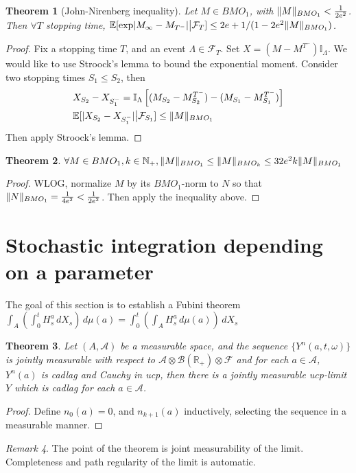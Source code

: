 \documentclass[openany,oneside]{book}
\newtheorem{thm}{Theorem}[section]
\theoremstyle{definition}
\theoremstyle{remark}
\newtheorem{rem}[thm]{Remark}
\newcommand{\E}{\mathbb{E}} %
\newcommand{\I}{\mathbb{I}} %
\DeclarePairedDelimiter{\abs}{\lvert}{\rvert} %
\DeclarePairedDelimiter{\norm}{\lVert}{\rVert} %
\begin{document}
\begin{thm}[John-Nirenberg inequality]
Let $M\in BMO_1$, with $\norm{M}_{BMO_1} < \frac{1}{2e^2}$. Then $\forall T$ stopping time, $\E[\exp\abs{M_\infty - M_{T^-}} \big\vert \mathcal{F}_T] \le 2e + 1/(1-2e^2 \norm{M}_{BMO_1})$.
\end{thm}
\begin{proof}
Fix a stopping time $T$, and an event $\Lambda \in \mathcal{F}_T$. Set $X=(M-M^{T^-})\I_\Lambda$. We would like to use Stroock's lemma to bound the exponential moment. Consider two stopping times $S_1 \le S_2$, then
\begin{align*}
& X_{S_2} - X_{S_1^-} = \I_\Lambda \left[(M_{S_2}-M^{T^-}_{S_2}) - (M_{S_1}-M^{T^-}_{S_1})\right] \\
& \E[\abs{X_{S_2} - X_{S_1^-}} \big\vert \mathcal{F}_{S_1}] \le \norm{M}_{BMO_1}
\end{align*}
Then apply Stroock's lemma.
\end{proof}

\begin{thm}
$\forall M \in BMO_1, k\in \mathbb{N}_+, \norm{M}_{BMO_1} \le \norm{M}_{BMO_k} \le 32 e^2 k \norm{M}_{BMO_1}$
\end{thm}
\begin{proof}
WLOG, normalize $M$ by its $BMO_1$-norm to $N$ so that $\norm{N}_{BMO_1} = \frac{1}{4e^2} < \frac{1}{2e^2}$. Then apply the inequality above.
\end{proof}

\section{Stochastic integration depending on a parameter}
The goal of this section is to establish a Fubini theorem $\int_A \left(\int_0^t H^a_s \,d X_s\right) \,d\mu(a) = \int_0^t \left(\int_A H^a_s \,d\mu(a)\right) \,d X_s$

\begin{thm}
Let $(A,\mathcal{A})$ be a measurable space, and the sequence $\{Y^n(a,t,\omega)\}$ is jointly measurable with respect to $\mathcal{A} \otimes \mathcal{B}(\mathbb{R}_+) \otimes \mathcal{F}$ and for each $a\in\mathcal{A}$, $Y^n(a)$ is cadlag and Cauchy in ucp, then there is a jointly measurable ucp-limit $Y$ which is cadlag for each $a\in \mathcal{A}$.
\end{thm}
\begin{proof}
Define $n_0(a)=0$, and $n_{k+1}(a)$ inductively, selecting the sequence in a measurable manner.
\end{proof}
\begin{rem}
The point of the theorem is joint measurability of the limit. Completeness and path regularity of the limit is automatic.
\end{rem}
\end{document}

